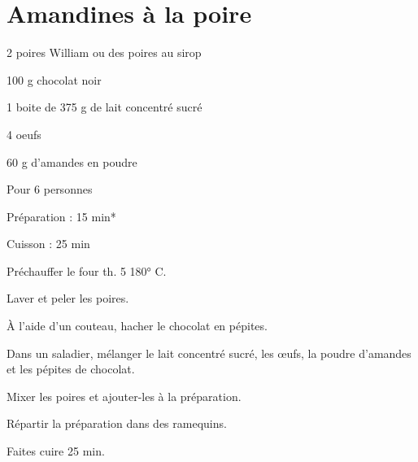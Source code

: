 \section[\normalsize{Amandines à la poire}]{Amandines à la poire}

\begin{ingredients}
\item 2 poires William ou des poires au sirop 
\item 100 g chocolat noir 
\item	1 boite de 375 g de lait concentr\'e sucr\'e
\item	4 oeufs
\item 60 g d’amandes en poudre 
\end{ingredients}
\begin{infos}
\item Pour 6 personnes
\item Préparation : 15 min*
\item Cuisson : 25 min
\end{infos}
\begin{etapes}
\item Pr\'echauffer le four th. 5 180° C.
\item Laver et peler les poires.
\item \`A l’aide d’un couteau, hacher le chocolat en p\'epites.
\item Dans un saladier, m\'elanger le lait concentr\'e sucr\'e, les œufs, la poudre d’amandes et les p\'epites de chocolat.
\item Mixer les poires et ajouter-les \`a la pr\'eparation.
\item R\'epartir la pr\'eparation dans des ramequins.
\item Faites cuire 25 min.
\end{etapes}
\begin{conseils}
\end{conseils}
